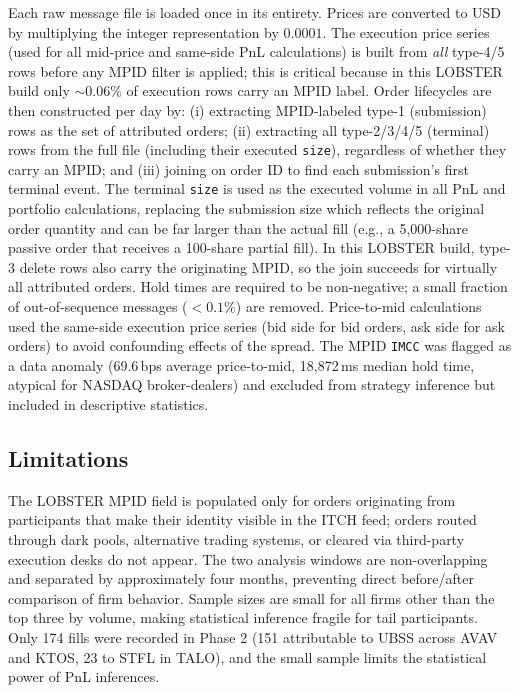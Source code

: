 \documentclass[11pt, letterpaper]{article}
\begin{document}
Each raw message file is loaded once in its entirety.
Prices are converted to USD by multiplying the integer representation by
$0.0001$.
The execution price series (used for all mid-price and same-side PnL
calculations) is built from \emph{all} type-4/5 rows before any MPID filter
is applied; this is critical because in this LOBSTER build only $\sim$0.06\%
of execution rows carry an MPID label.
Order lifecycles are then constructed per day by: (i) extracting
MPID-labeled type-1 (submission) rows as the set of attributed orders;
(ii) extracting all type-2/3/4/5 (terminal) rows from the full file
(including their executed \texttt{size}), regardless of whether they carry
an MPID; and (iii) joining on order ID to find each submission's first
terminal event.
The terminal \texttt{size} is used as the executed volume in all PnL and
portfolio calculations, replacing the submission size which reflects the
original order quantity and can be far larger than the actual fill
(e.g., a 5,000-share passive order that receives a 100-share partial fill).
In this LOBSTER build, type-3 delete rows also carry the originating MPID,
so the join succeeds for virtually all attributed orders.
Hold times are required to be non-negative; a small fraction of
out-of-sequence messages ($<0.1\%$) are removed.
Price-to-mid calculations used the same-side execution price series
(bid side for bid orders, ask side for ask orders) to avoid confounding
effects of the spread.
The MPID \texttt{IMCC} was flagged as a data anomaly (69.6\,bps average
price-to-mid, 18,872\,ms median hold time, atypical for NASDAQ broker-dealers)
and excluded from strategy inference but included in descriptive statistics.

\subsection{Limitations}

The LOBSTER MPID field is populated only for orders originating from
participants that make their identity visible in the ITCH feed; orders routed
through dark pools, alternative trading systems, or cleared via third-party
execution desks do not appear.
The two analysis windows are non-overlapping and separated by approximately
four months, preventing direct before/after comparison of firm behavior.
Sample sizes are small for all firms other than the top three by volume,
making statistical inference fragile for tail participants.
Only 174 fills were recorded in Phase 2 (151 attributable to UBSS across
AVAV and KTOS, 23 to STFL in TALO), and the small sample limits the
statistical power of PnL inferences.
\end{document}
